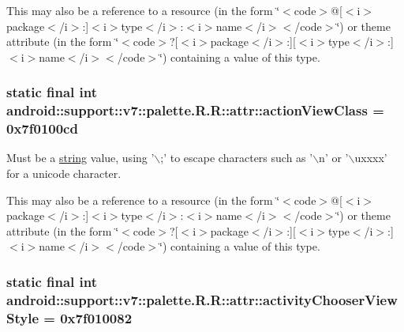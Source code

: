 This may also be a reference to a resource (in the form \char`\"{}$<$code$>$@\mbox{[}$<$i$>$package$<$/i$>$:\mbox{]}$<$i$>$type$<$/i$>$:$<$i$>$name$<$/i$>$$<$/code$>$\char`\"{}) or theme attribute (in the form \char`\"{}$<$code$>$?\mbox{[}$<$i$>$package$<$/i$>$:\mbox{]}\mbox{[}$<$i$>$type$<$/i$>$:\mbox{]}$<$i$>$name$<$/i$>$$<$/code$>$\char`\"{}) containing a value of this type. \hypertarget{classandroid_1_1support_1_1v7_1_1palette_1_1_r_1_1attr_d9315f5f24ca211c769450b85fb1e412}{
\subsubsection[{actionViewClass}]{\setlength{\rightskip}{0pt plus 5cm}static final int android::support::v7::palette.R.R::attr::actionViewClass = 0x7f0100cd}}
\label{classandroid_1_1support_1_1v7_1_1palette_1_1_r_1_1attr_d9315f5f24ca211c769450b85fb1e412}


Must be a \hyperlink{classandroid_1_1support_1_1v7_1_1palette_1_1_r_1_1string}{string} value, using '$\backslash$;' to escape characters such as '$\backslash$n' or '$\backslash$uxxxx' for a unicode character. 

This may also be a reference to a resource (in the form \char`\"{}$<$code$>$@\mbox{[}$<$i$>$package$<$/i$>$:\mbox{]}$<$i$>$type$<$/i$>$:$<$i$>$name$<$/i$>$$<$/code$>$\char`\"{}) or theme attribute (in the form \char`\"{}$<$code$>$?\mbox{[}$<$i$>$package$<$/i$>$:\mbox{]}\mbox{[}$<$i$>$type$<$/i$>$:\mbox{]}$<$i$>$name$<$/i$>$$<$/code$>$\char`\"{}) containing a value of this type. \hypertarget{classandroid_1_1support_1_1v7_1_1palette_1_1_r_1_1attr_f09ea2d15b556ebd9bbd47d1dde2d881}{
\subsubsection[{activityChooserViewStyle}]{\setlength{\rightskip}{0pt plus 5cm}static final int android::support::v7::palette.R.R::attr::activityChooserViewStyle = 0x7f010082}}
\label{classandroid_1_1support_1_1v7_1_1palette_1_1_r_1_1attr_f09ea2d15b556ebd9bbd47d1dde2d881}


